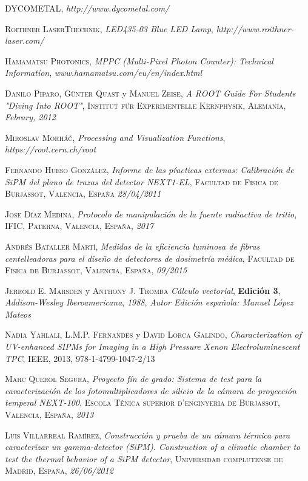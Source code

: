 \begin{thebibliography}{99}
 \textsc{DYCOMETAL},
\textit{http://www.dycometal.com/}

 \textsc{Roithner LaserThechnik},
\textit{LED435-03 Blue LED Lamp}, \textit{http://www.roithner-laser.com/}

 \textsc{Hamamatsu Photonics},
\textit{MPPC (Multi-Pixel Photon Counter): Technical Information}, \textit{www.hamamatsu.com/eu/en/index.html}

 \textsc{Danilo Piparo}, \textsc{Günter Quast} y \textsc{Manuel Zeise},
\textit{A ROOT Guide For Students "Diving Into ROOT"}, \textsc{Institut für Experimentelle Kernphysik, Alemania}, \textit{Febrary, 2012}

 \textsc{Miroslav Morháč},
\textit{Processing and Visualization Functions}, \textit{https://root.cern.ch/root}

 \textsc{Fernando Hueso González},
\textit{Informe de las pŕacticas externas: Calibración de SiPM del plano de trazas del detector NEXT1-EL}, \textsc{Facultad de Física de Burjassot, Valencia, España} \textit{28/04/2011}

 \textsc{Jose Díaz Medina},
\textit{Protocolo de manipulación de la fuente radiactiva de tritio}, \textsc{IFIC, Paterna, Valencia, España}, \textit{2017}

 \textsc{Andrés Bataller Martí},
\textit{Medidas de la eficiencia luminosa de fibras centelleadoras para el diseño de detectores de dosimetría médica}, \textsc{Facultad de Física de Burjassot, Valencia, España}, \textit{09/2015}

 \textsc{Jerrold E. Marsden} y \textsc{Anthony J. Tromba}
\textit{Cálculo vectorial}, \textbf{Edición 3}, \textit{Addison-Wesley Iberoamericana}, \textit{1988}, \textit{Autor Edición española: Manuel López Mateos}

 \textsc{Nadia Yahlali}, \textsc{L.M.P. Fernandes} y \textsc{David Lorca Galindo},
\textit{Characterization of UV-enhanced SIPMs for Imaging in a High Pressure Xenon Electroluminescent TPC}, \textsc{IEEE}, \textsc{2013}, \textsc{978-1-4799-1047-2/13}

 \textsc{Marc Querol Segura},
\textit{Proyecto fín de grado: Sistema de test para la caracterización de los fotomultiplicadores de silicio de la cámara de proyección temperal NEXT-100}, \textsc{Escola Ténica superior d'enginyeria de Burjassot, Valencia, España}, \textit{2013}

 \textsc{Luis Villarreal Ramírez},
\textit{Construcción y prueba de un cámara térmica para caracterizar un gamma-detector (SiPM). Construction of a climatic chamber to test the thermal behavior of a SiPM detector}, \textsc{Universidad complutense de Madrid, España}, \textit{26/06/2012}
 
\end{thebibliography}